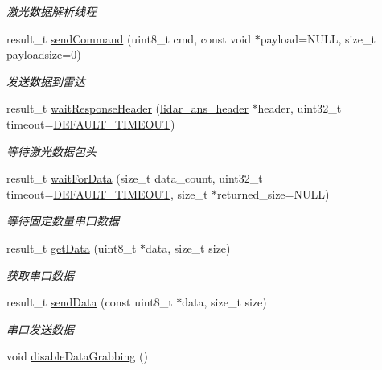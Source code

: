 \begin{DoxyCompactItemize}
\begin{DoxyCompactList}\small\item\em 激光数据解析线程 ~\newline
\end{DoxyCompactList}\item 
result\+\_\+t \hyperlink{classydlidar_1_1_y_dlidar_driver_ab096ecdc3642c04e3e8b000e210c0962}{send\+Command} (uint8\+\_\+t cmd, const void $\ast$payload=N\+U\+LL, size\+\_\+t payloadsize=0)
\begin{DoxyCompactList}\small\item\em 发送数据到雷达 ~\newline
\end{DoxyCompactList}\item 
result\+\_\+t \hyperlink{classydlidar_1_1_y_dlidar_driver_a0e089d615193ccef4bf488f63ff8130e}{wait\+Response\+Header} (\hyperlink{structlidar__ans__header}{lidar\+\_\+ans\+\_\+header} $\ast$header, uint32\+\_\+t timeout=\hyperlink{classydlidar_1_1_y_dlidar_driver_a13a4f2dc4067b43794b2c47c06d5d27aa07c79ce96f468ff4b40495ef84584442}{D\+E\+F\+A\+U\+L\+T\+\_\+\+T\+I\+M\+E\+O\+UT})
\begin{DoxyCompactList}\small\item\em 等待激光数据包头 ~\newline
\end{DoxyCompactList}\item 
result\+\_\+t \hyperlink{classydlidar_1_1_y_dlidar_driver_a13f404b44f51941d1642bfe250de3522}{wait\+For\+Data} (size\+\_\+t data\+\_\+count, uint32\+\_\+t timeout=\hyperlink{classydlidar_1_1_y_dlidar_driver_a13a4f2dc4067b43794b2c47c06d5d27aa07c79ce96f468ff4b40495ef84584442}{D\+E\+F\+A\+U\+L\+T\+\_\+\+T\+I\+M\+E\+O\+UT}, size\+\_\+t $\ast$returned\+\_\+size=N\+U\+LL)
\begin{DoxyCompactList}\small\item\em 等待固定数量串口数据 ~\newline
\end{DoxyCompactList}\item 
result\+\_\+t \hyperlink{classydlidar_1_1_y_dlidar_driver_ad787e714bc05e5a70a42b096e632c60f}{get\+Data} (uint8\+\_\+t $\ast$data, size\+\_\+t size)
\begin{DoxyCompactList}\small\item\em 获取串口数据 ~\newline
\end{DoxyCompactList}\item 
result\+\_\+t \hyperlink{classydlidar_1_1_y_dlidar_driver_a998ba4b05927d19e8a0d4d29d3d47656}{send\+Data} (const uint8\+\_\+t $\ast$data, size\+\_\+t size)
\begin{DoxyCompactList}\small\item\em 串口发送数据 ~\newline
\end{DoxyCompactList}\item 
void \hyperlink{classydlidar_1_1_y_dlidar_driver_ae66565bee3cdb8b74698b691f2ab1e63}{disable\+Data\+Grabbing} ()\hypertarget{classydlidar_1_1_y_dlidar_driver_ae66565bee3cdb8b74698b691f2ab1e63}{}\label{classydlidar_1_1_y_dlidar_driver_ae66565bee3cdb8b74698b691f2ab1e63}


\end{DoxyCompactItemize}
